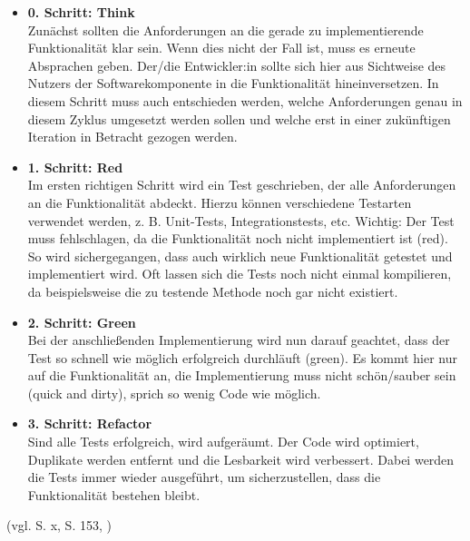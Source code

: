 \documentclass[a0,landscape]{a0poster}
\newcommand{\gqq}[1]{\glqq #1\grqq}
\begin{document}
\begin{multicols}{4}
\begin{itemize}
\item \textbf{0. Schritt: \gqq{Think}}\\
Zunächst sollten die Anforderungen an die gerade zu implementierende Funktionalität klar sein.
Wenn dies nicht der Fall ist, muss es erneute Absprachen geben.
Der/die Entwickler:in sollte sich hier aus Sichtweise des Nutzers der Softwarekomponente in die Funktionalität hineinversetzen.
In diesem Schritt muss auch entschieden werden, welche Anforderungen genau in diesem Zyklus umgesetzt werden sollen und welche erst in einer zukünftigen Iteration in Betracht gezogen werden.
\item \textbf{1. Schritt: \gqq{Red}}\\
Im ersten richtigen Schritt wird ein Test geschrieben, der alle Anforderungen an die Funktionalität abdeckt.
Hierzu können verschiedene Testarten verwendet werden, z. B. Unit-Tests, Integrationstests, etc.
Wichtig: Der Test muss fehlschlagen, da die Funktionalität noch nicht implementiert ist (\gqq{red}).
So wird sichergegangen, dass auch wirklich neue Funktionalität getestet und implementiert wird.
Oft lassen sich die Tests noch nicht einmal kompilieren, da beispielsweise die zu testende Methode noch gar nicht existiert.
\item \textbf{2. Schritt: \gqq{Green}}\\
Bei der anschließenden Implementierung wird nun darauf geachtet, dass der Test so schnell wie möglich erfolgreich durchläuft (\gqq{green}).
Es kommt hier nur auf die Funktionalität an, die Implementierung muss nicht \gqq{schön/sauber} sein (\gqq{quick and dirty}), sprich \gqq{so wenig Code wie möglich}.
\item \textbf{3. Schritt: \gqq{Refactor}}\\
Sind alle Tests erfolgreich, wird \gqq{aufgeräumt}.
Der Code wird optimiert, Duplikate werden entfernt und die Lesbarkeit wird verbessert.
Dabei werden die Tests immer wieder ausgeführt, um sicherzustellen, dass die Funktionalität bestehen bleibt.
\end{itemize}

(vgl. \cite{beck_test_2022} S. x, \cite{schatten_qualitatssicherung_2010} S. 153, \cite{ionos_test_2020})



\end{multicols}
\end{document}
